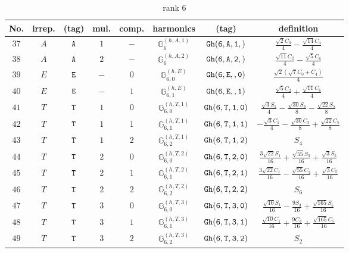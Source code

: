 \documentclass[fleqn,8pt]{jsarticle}
\begin{document}
\begin{table}[ht!]
\begin{center}
\caption{rank 6}
\renewcommand{\arraystretch}{1.3}
\begin{tabular}{cccccccc} \hline \hline
No. & irrep. & (tag) & mul. & comp. & harmonics & (tag) & definition \\ \hline
$ 37 $ & $ A $ & $ {\tt A} $ & $ 1 $ & $ - $ & $ \mathbb{G}_{6}^{(h,A,1)} $ & $ {\tt Gh(6,A,1,)} $ & $ \frac{\sqrt{2} C_{0}}{4} - \frac{\sqrt{14} C_{4}}{4} $ \\
$ 38 $ & $ A $ & $ {\tt A} $ & $ 2 $ & $ - $ & $ \mathbb{G}_{6}^{(h,A,2)} $ & $ {\tt Gh(6,A,2,)} $ & $ \frac{\sqrt{11} C_{2}}{4} - \frac{\sqrt{5} C_{6}}{4} $ \\
$ 39 $ & $ E $ & $ {\tt E} $ & $ - $ & $ 0 $ & $ \mathbb{G}_{6,0}^{(h,E)} $ & $ {\tt Gh(6,E,,0)} $ & $ \frac{\sqrt{2} \left(\sqrt{7} C_{0} + C_{4}\right)}{4} $ \\
$ 40 $ & $ E $ & $ {\tt E} $ & $ - $ & $ 1 $ & $ \mathbb{G}_{6,1}^{(h,E)} $ & $ {\tt Gh(6,E,,1)} $ & $ \frac{\sqrt{5} C_{2}}{4} + \frac{\sqrt{11} C_{6}}{4} $ \\
$ 41 $ & $ T $ & $ {\tt T} $ & $ 1 $ & $ 0 $ & $ \mathbb{G}_{6,0}^{(h,T,1)} $ & $ {\tt Gh(6,T,1,0)} $ & $ \frac{\sqrt{3} S_{1}}{4} - \frac{\sqrt{30} S_{3}}{8} - \frac{\sqrt{22} S_{5}}{8} $ \\
$ 42 $ & $ T $ & $ {\tt T} $ & $ 1 $ & $ 1 $ & $ \mathbb{G}_{6,1}^{(h,T,1)} $ & $ {\tt Gh(6,T,1,1)} $ & $ - \frac{\sqrt{3} C_{1}}{4} - \frac{\sqrt{30} C_{3}}{8} + \frac{\sqrt{22} C_{5}}{8} $ \\
$ 43 $ & $ T $ & $ {\tt T} $ & $ 1 $ & $ 2 $ & $ \mathbb{G}_{6,2}^{(h,T,1)} $ & $ {\tt Gh(6,T,1,2)} $ & $ S_{4} $ \\
$ 44 $ & $ T $ & $ {\tt T} $ & $ 2 $ & $ 0 $ & $ \mathbb{G}_{6,0}^{(h,T,2)} $ & $ {\tt Gh(6,T,2,0)} $ & $ \frac{3 \sqrt{22} S_{1}}{16} + \frac{\sqrt{55} S_{3}}{16} + \frac{\sqrt{3} S_{5}}{16} $ \\
$ 45 $ & $ T $ & $ {\tt T} $ & $ 2 $ & $ 1 $ & $ \mathbb{G}_{6,1}^{(h,T,2)} $ & $ {\tt Gh(6,T,2,1)} $ & $ \frac{3 \sqrt{22} C_{1}}{16} - \frac{\sqrt{55} C_{3}}{16} + \frac{\sqrt{3} C_{5}}{16} $ \\
$ 46 $ & $ T $ & $ {\tt T} $ & $ 2 $ & $ 2 $ & $ \mathbb{G}_{6,2}^{(h,T,2)} $ & $ {\tt Gh(6,T,2,2)} $ & $ S_{6} $ \\
$ 47 $ & $ T $ & $ {\tt T} $ & $ 3 $ & $ 0 $ & $ \mathbb{G}_{6,0}^{(h,T,3)} $ & $ {\tt Gh(6,T,3,0)} $ & $ \frac{\sqrt{10} S_{1}}{16} - \frac{9 S_{3}}{16} + \frac{\sqrt{165} S_{5}}{16} $ \\
$ 48 $ & $ T $ & $ {\tt T} $ & $ 3 $ & $ 1 $ & $ \mathbb{G}_{6,1}^{(h,T,3)} $ & $ {\tt Gh(6,T,3,1)} $ & $ \frac{\sqrt{10} C_{1}}{16} + \frac{9 C_{3}}{16} + \frac{\sqrt{165} C_{5}}{16} $ \\
$ 49 $ & $ T $ & $ {\tt T} $ & $ 3 $ & $ 2 $ & $ \mathbb{G}_{6,2}^{(h,T,3)} $ & $ {\tt Gh(6,T,3,2)} $ & $ S_{2} $ \\
 \hline \hline
\end{tabular}
\end{center}
\end{table}
\end{document}
